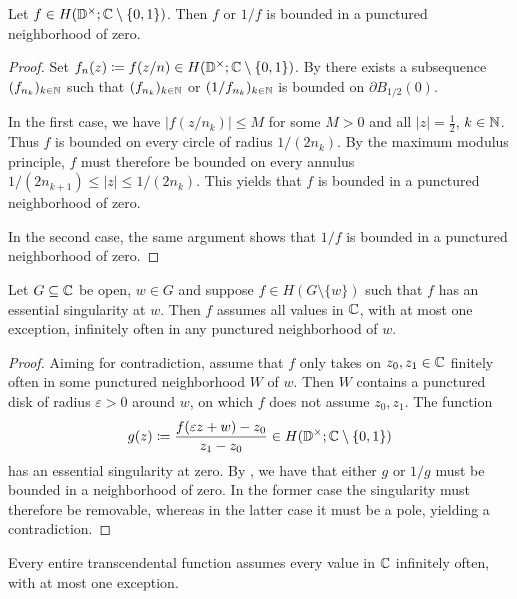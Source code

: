 \begin{lemma} \label{lem:great-picard-bounded}
    Let $f \in H(\mathbb{D}^\times; \mathbb{C} \setminus \{ 0, 1 \})$. Then $f$ or $1/f$ is bounded in a punctured neighborhood of zero.
\end{lemma}

\begin{proof}
    Set $f_n(z) \coloneqq f(z / n) \in H(\mathbb{D}^\times; \mathbb{C} \setminus \{ 0, 1 \})$. By  there exists a subsequence $(f_{n_k})_{k \in \mathbb{N}}$ such that $(f_{n_k})_{k \in \mathbb{N}}$ or $(1 / f_{n_k})_{k \in \mathbb{N}}$ is bounded on $\partial B_{1/2}(0)$.

    In the first case, we have $\vert f(z / n_k) \vert \leq M$ for some $M > 0$ and all $\vert z \vert = \frac{1}{2}$, $k \in \mathbb{N}$. Thus $f$ is bounded on every circle of radius $1 / (2 n_k)$. By the maximum modulus principle, $f$ must therefore be bounded on every annulus $1 / (2 n_{k + 1}) \leq \vert z \vert \leq 1 / (2 n_k)$. This yields that $f$ is bounded in a punctured neighborhood of zero.

    In the second case, the same argument shows that $1 / f$ is bounded in a punctured neighborhood of zero.
\end{proof}

\begin{theorem} \label{thm:picards-great-theorem}
    Let $G \subseteq \mathbb{C}$ be open, $w \in G$ and suppose $f \in H(G \setminus \{ w \})$ such that $f$ has an essential singularity at $w$. Then $f$ assumes all values in $\mathbb{C}$, with at most one exception, infinitely often in any punctured neighborhood of $w$.
\end{theorem}

\begin{proof}
    Aiming for contradiction, assume that $f$ only takes on $z_0, z_1 \in \mathbb{C}$ finitely often in some punctured neighborhood $W$ of $w$. Then $W$ contains a punctured disk of radius $\varepsilon > 0$ around $w$, on which $f$ does not assume $z_0, z_1$. The function
    $$ g(z) \coloneqq \frac{f(\varepsilon z + w) - z_0}{z_1 - z_0} \in H(\mathbb{D}^\times; \mathbb{C} \setminus \{ 0, 1 \}) $$
    has an essential singularity at zero. By , we have that either $g$ or $1/g$ must be bounded in a neighborhood of zero. In the former case the singularity must therefore be removable, whereas in the latter case it must be a pole, yielding a contradiction.
\end{proof}

\begin{corollary} \label{cor:transcendental-every-value-inf}
    Every entire transcendental function assumes every value in $\mathbb{C}$ infinitely often, with at most one exception.
\end{corollary}

